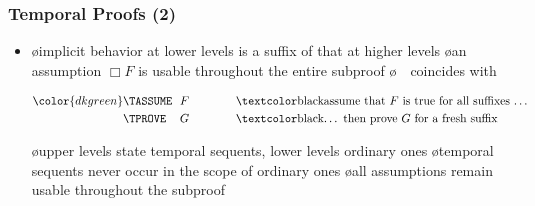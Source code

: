 \documentclass[fleqn]{beamer}
\begin{document}
\begin{frame}
  \frametitle{Temporal Proofs (2)}

  \begin{itemize}
  \item {}

    \begin{itemize}
    \o implicit behavior at lower levels is a suffix of that at higher levels
    \o an assumption $\Box F$ is usable throughout the entire subproof
    \o {}\ \ coincides with\ \ 
    \end{itemize}

  \oo {}

    \medskip

    {\small
    \qquad\(\color{dkgreen}
    \begin{array}[t]{@{}l@{\ \ }l@{\qquad\qquad}l}
      \TASSUME & F  & \text{\tc{black}{assume that $F$ is true for all suffixes \ldots}}\\[1mm]
      \TPROVE  & G  & \text{\tc{black}{\ldots\ then prove $G$ for a fresh suffix}}
    \end{array}
    \)
    }

  \oo {}

    \begin{itemize}
    \o upper levels state temporal sequents, lower levels ordinary ones
    \o temporal sequents never occur in the scope of ordinary ones
    \o all assumptions remain usable throughout the subproof
    \end{itemize}
  \end{itemize}
\end{frame}
\end{document}
